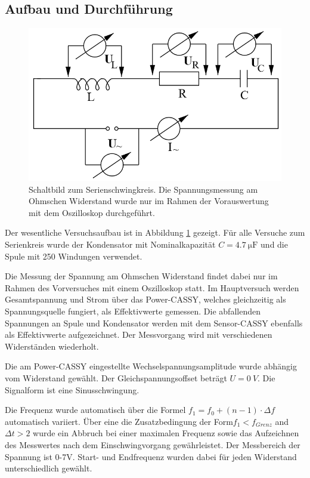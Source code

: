 \documentclass[12pt,a4paper]{article}
\begin{document}
\subsection{Aufbau und Durchführung}

\begin{figure}
\centering
\includegraphics[scale=0.8]{Bilder/AufbauSerie.png}
\caption{Schaltbild zum Serienschwingkreis. Die Spannungsmessung am Ohmschen Widerstand wurde nur im Rahmen der Vorauswertung mit dem Oszilloskop durchgeführt.}
\label{fig:AufbauSerie}
\end{figure}

Der wesentliche Versuchsaufbau ist in Abbildung \ref{fig:AufbauSerie} gezeigt. Für alle Versuche zum Serienkreis wurde der Kondensator mit Nominalkapazität $C=\SI{4,7}{\micro \F}$ und die Spule mit 250 Windungen verwendet.

Die Messung der Spannung am Ohmschen Widerstand findet dabei nur im Rahmen des Vorversuches mit einem Oszilloskop statt.
Im Hauptversuch werden Gesamtspannung und Strom über das Power-CASSY, welches gleichzeitig als Spannungsquelle fungiert, als Effektivwerte gemessen. Die abfallenden Spannungen an Spule und Kondensator werden mit dem Sensor-CASSY ebenfalls als Effektivwerte aufgezeichnet. Der Messvorgang wird mit verschiedenen Widerständen wiederholt.

Die am Power-CASSY eingestellte Wechselspannungsamplitude wurde abhängig vom Widerstand gewählt. Der Gleichspannungsoffset beträgt $U = \SI{0}{V}$. Die Signalform ist eine Sinusschwingung.

Die Frequenz wurde automatisch über die Formel $f_1 = f_0 +(n-1) \cdot \Delta f$ automatisch variiert. Über eine die Zusatzbedingung der Form$f_1 < f_{Grenz}$ and $\Delta t > 2$ wurde ein Abbruch bei einer maximalen Frequenz sowie das Aufzeichnen des Messwertes nach dem Einschwingvorgang gewährleistet. Der Messbereich der Spannung ist 0-7V. Start- und Endfrequenz wurden dabei für jeden Widerstand unterschiedlich gewählt.
\end{document}
